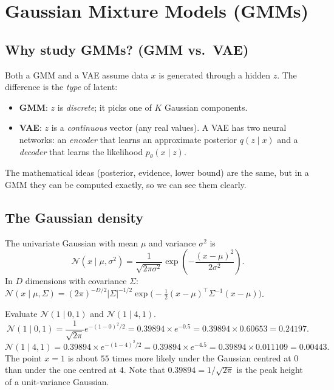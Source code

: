 \documentclass[11pt,a4paper]{article}
\newcommand{\N}{\mathcal{N}}
\begin{document}
\section{Gaussian Mixture Models (GMMs)}

\subsection{Why study GMMs? (GMM vs.\ VAE)}

Both a GMM and a VAE assume data $x$ is generated through a hidden $z$. The difference is the \emph{type} of latent:
\begin{itemize}[nosep]
\item \textbf{GMM}: $z$ is \emph{discrete}; it picks one of $K$ Gaussian components.
\item \textbf{VAE}: $z$ is a \emph{continuous} vector (any real values). A VAE has two neural networks: an \emph{encoder} that learns an approximate posterior $q(z\mid x)$ and a \emph{decoder} that learns the likelihood $p_\theta(x\mid z)$.
\end{itemize}
The mathematical ideas (posterior, evidence, lower bound) are the same, but in a GMM they can be computed exactly, so we can see them clearly.

\subsection{The Gaussian density}

The univariate Gaussian with mean $\mu$ and variance $\sigma^2$ is
\[
\N(x\mid\mu,\sigma^2)=\frac{1}{\sqrt{2\pi\sigma^2}}\exp\!\left(-\frac{(x-\mu)^2}{2\sigma^2}\right).
\]
In $D$ dimensions with covariance $\Sigma$:
$\N(x\mid\mu,\Sigma)=(2\pi)^{-D/2}|\Sigma|^{-1/2}\exp\!\big(-\tfrac12(x-\mu)^\top\Sigma^{-1}(x-\mu)\big)$.

\begin{example}
Evaluate $\N(1\mid 0,1)$ and $\N(1\mid 4,1)$.
\[
\N(1\mid 0,1)=\frac{1}{\sqrt{2\pi}}e^{-(1-0)^2/2}=0.39894\times e^{-0.5}=0.39894\times0.60653=\mathbf{0.24197}.
\]
\[
\N(1\mid 4,1)=0.39894\times e^{-(1-4)^2/2}=0.39894\times e^{-4.5}=0.39894\times0.011109=\mathbf{0.00443}.
\]
The point $x=1$ is about $55$ times more likely under the Gaussian centred at $0$ than under the one centred at $4$. Note that $0.39894=1/\sqrt{2\pi}$ is the peak height of a unit-variance Gaussian.
\end{example}
\end{document}
